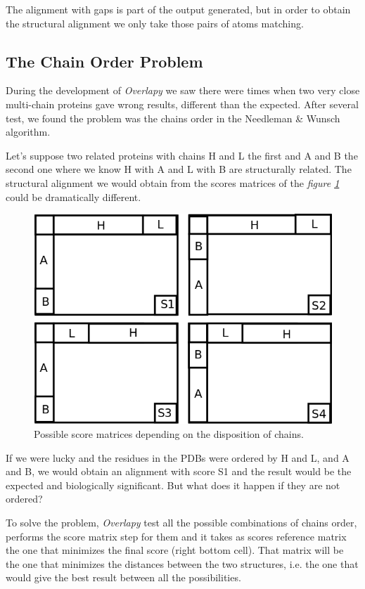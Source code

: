 \documentclass{article}
\begin{document}
The alignment with gaps is part of the output generated, but in order to obtain the structural alignment we only take those pairs of atoms matching.

\subsection*{\color{gray}The Chain Order Problem}

During the development of \textit{Overlapy} we saw there were times when two very close multi-chain proteins gave wrong results, different than the expected. After several test, we found the problem was the chains order in the Needleman \& Wunsch algorithm. 

Let's suppose two related proteins with chains H and L the first and A and B the second one where we know H with A and L with B are structurally related. The structural alignment we would obtain from the scores matrices of the \textit{figure \ref{fig:nwmatrices}} could be dramatically different.

\begin{figure}[!h]
	\centering
	\includegraphics[scale=0.2]{images/matrices.png}
	\caption{Possible score matrices depending on the disposition of chains.}
	\label{fig:nwmatrices}
\end{figure}

If we were lucky and the residues in the PDBs were ordered by H and L, and A and B, we would obtain an alignment with score S1 and the result would be the expected and biologically significant. But what does it happen if they are not ordered?

To solve the problem, \textit{Overlapy} test all the possible combinations of chains order, performs the score matrix step for them and it takes as scores reference matrix the one that minimizes the final score (right bottom cell). That matrix will be the one that minimizes the distances between the two structures, i.e. the one that would give the best result between all the possibilities.
\end{document}
